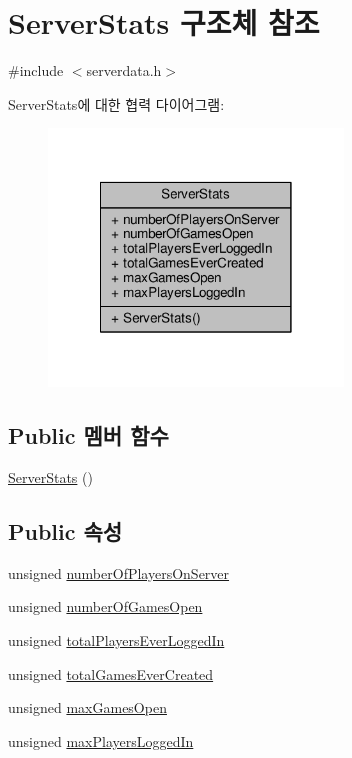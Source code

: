 \hypertarget{struct_server_stats}{\section{Server\-Stats 구조체 참조}
\label{struct_server_stats}
}


{\ttfamily \#include $<$serverdata.\-h$>$}



Server\-Stats에 대한 협력 다이어그램\-:\nopagebreak
\begin{figure}[H]
\begin{center}
\leavevmode
\includegraphics[width=222pt]{struct_server_stats__coll__graph}
\end{center}
\end{figure}
\subsection*{Public 멤버 함수}
\begin{DoxyCompactItemize}
\item 
\hyperlink{struct_server_stats_a1ed311eaeb034e47dd26f531114b9ad1}{Server\-Stats} ()
\end{DoxyCompactItemize}
\subsection*{Public 속성}
\begin{DoxyCompactItemize}
\item 
unsigned \hyperlink{struct_server_stats_ae5c627e4a9c50bf2ff6c037ec0bc81d0}{number\-Of\-Players\-On\-Server}
\item 
unsigned \hyperlink{struct_server_stats_a6718463c122b2cf94a315fd796084838}{number\-Of\-Games\-Open}
\item 
unsigned \hyperlink{struct_server_stats_a18a286038d220b5de804f50e30c66f22}{total\-Players\-Ever\-Logged\-In}
\item 
unsigned \hyperlink{struct_server_stats_a66a158077e23174434110fb8fc26b9ff}{total\-Games\-Ever\-Created}
\item 
unsigned \hyperlink{struct_server_stats_a25778c7b4a7ac21c22bcc67dda3ff54d}{max\-Games\-Open}
\item 
unsigned \hyperlink{struct_server_stats_ab6da76ba04d76821233d4ed4bbf4a2ae}{max\-Players\-Logged\-In}
\end{DoxyCompactItemize}


